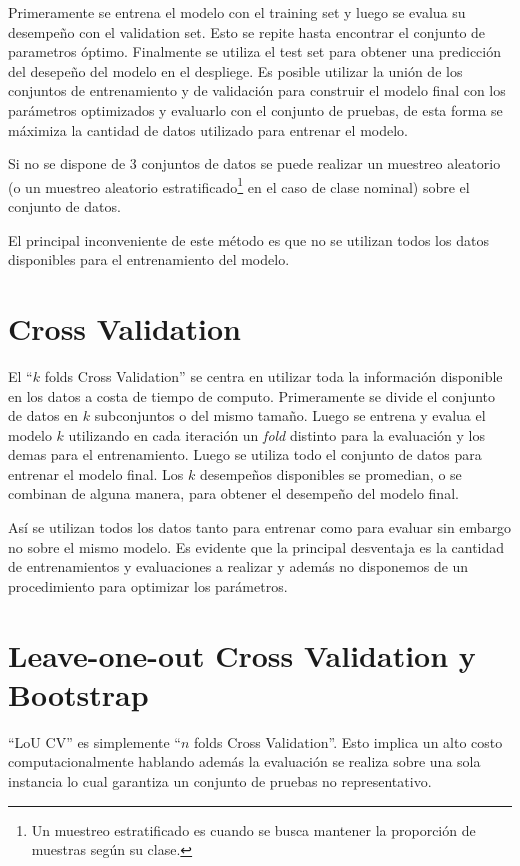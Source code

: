 \documentclass[10pt,a4paper]{article}
\begin{document}
Primeramente se entrena el modelo con el training set y luego se evalua su desempeño con el validation set. Esto se repite hasta encontrar el conjunto de parametros óptimo. Finalmente se utiliza el test set para obtener una predicción del desepeño del modelo en el despliege. Es posible utilizar la unión de los conjuntos de entrenamiento y de validación para construir el modelo final con los parámetros optimizados y evaluarlo con el conjunto de pruebas, de esta forma se máximiza la cantidad de datos utilizado para entrenar el modelo.

Si no se dispone de 3 conjuntos de datos se puede realizar un muestreo aleatorio (o un muestreo aleatorio estratificado\footnote{Un muestreo estratificado es cuando se busca mantener la proporción de muestras según su clase.} en el caso de clase nominal) sobre el conjunto de datos.

El principal inconveniente de este método es que no se utilizan todos los datos disponibles para el entrenamiento del modelo.

\section{Cross Validation}
El ``$k$ folds Cross Validation''  se centra en utilizar toda la información disponible en los datos a costa de tiempo de computo. Primeramente se divide el conjunto de datos en $k$ subconjuntos o  del mismo tamaño. Luego se entrena y evalua el modelo $k$ utilizando en cada iteración un \textit{fold} distinto para la evaluación y los demas para el entrenamiento. Luego se utiliza todo el conjunto de datos para entrenar el modelo final. Los $k$ desempeños disponibles se promedian, o se combinan de alguna manera, para obtener el desempeño del modelo final.

Así se utilizan todos los datos tanto para entrenar como para evaluar sin embargo no sobre el mismo modelo. Es evidente que la principal desventaja es la cantidad de entrenamientos y evaluaciones a realizar y además no disponemos de un procedimiento para optimizar los parámetros.

\section{Leave-one-out Cross Validation y Bootstrap}
``LoU CV'' es simplemente ``$n$ folds Cross Validation''. Esto implica un alto costo computacionalmente hablando además la evaluación se realiza sobre una sola instancia lo cual garantiza un conjunto de pruebas no representativo.
\end{document}
